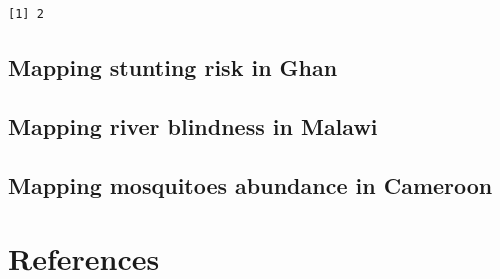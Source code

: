 \documentclass[
  letterpaper,
]{krantz}
\begin{document}
\begin{verbatim}
[1] 2
\end{verbatim}

\hypertarget{mapping-stunting-risk-in-ghan}{%
\section{Mapping stunting risk in
Ghan}\label{mapping-stunting-risk-in-ghan}}

\hypertarget{mapping-river-blindness-in-malawi}{%
\section{Mapping river blindness in
Malawi}\label{mapping-river-blindness-in-malawi}}

\hypertarget{mapping-mosquitoes-abundance-in-cameroon}{%
\section{Mapping mosquitoes abundance in
Cameroon}\label{mapping-mosquitoes-abundance-in-cameroon}}


\hypertarget{references}{%
\chapter*{References}\label{references}}

\end{document}
